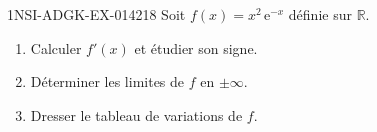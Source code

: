 \begin{exercice}{1NSI-ADGK-EX-014}{2}{18}
Soit $f(x) = x^2\,\mathrm{e}^{-x}$ définie sur $\mathbb{R}$.
\begin{enumerate}
  \item Calculer $f'(x)$ et étudier son signe.
  \item Déterminer les limites de $f$ en $\pm\infty$.
  \item Dresser le tableau de variations de $f$.
\end{enumerate}

\end{exercice}
